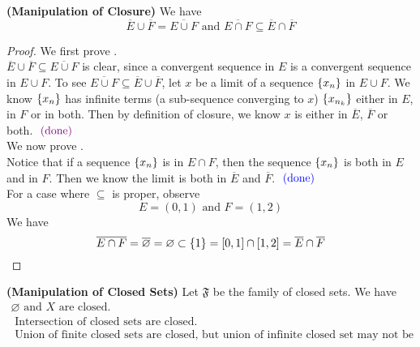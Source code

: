 \documentclass{report}
\begin{document}
\begin{theorem}
\label{3.2.4}
\textbf{(Manipulation of Closure)} We have
\begin{equation}
\overline{E}\cup \overline{F}=\overline{E\cup F}\text{ and }\overline{E\cap F}\subseteq \overline{E}\cap \overline{F}
\end{equation}
\end{theorem}
\begin{proof}
We first prove .\\

$\overline{E}\cup \overline{F}\subseteq \overline{E\cup F}$ is clear, since a convergent sequence in $E$ is a convergent sequence in $E\cup F$. To see $\overline{E\cup F}\subseteq \overline{E}\cup \overline{F}$, let $x$ be a limit of a sequence  $\{ x_n \}$ in $E\cup F$. We know $\{ x_n \}$ has infinite terms (a sub-sequence converging to $x$) $\{ x_{n_k} \}$ either in $E$, in $F$ or in both. Then by definition of closure, we know $x$ is either in $\overline{E}$, $\overline{F}$ or both. $\textcolor{violet}{\text{ (done) }}$\\


We now prove .\\

Notice that if a sequence $\{ x_n \}$ is in $E\cap F$, then the sequence $\{ x_n \}$ is both in $E$ and in $F$. Then we know the limit is both in  $\overline{E}$ and $\overline{F}$. $\textcolor{blue}{\text{ (done) }}$\\

For a case where $\subseteq $ is proper, observe
\begin{equation}
E=(0,1)\text{ and }F=(1,2)
\end{equation}
We have
\begin{equation}
\overline{E\cap F}=\overline{\varnothing}=\varnothing \subset \{ 1 \}=[0,1]\cap [1,2]=\overline{E}\cap \overline{F}
\end{equation}
\end{proof}
\begin{theorem}
\label{3.2.5}
\textbf{(Manipulation of Closed Sets)} Let $\mathfrak{F}$ be the family of closed sets. We have
\begin{gather}
\varnothing\text{ and }X\text{ are closed. }\\
\text{ Intersection of closed sets are closed. }\\
\text{ Union of finite closed sets are closed, but union of infinite closed set may not be closed. }
\end{gather}
\end{theorem}
\end{document}
